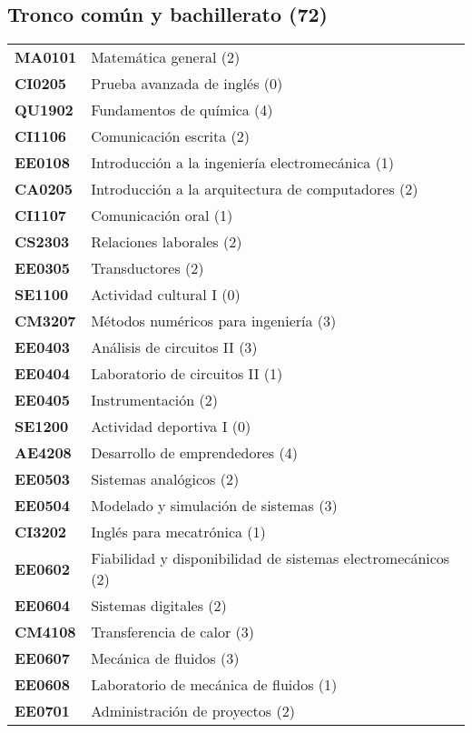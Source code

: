 \documentclass[letterpaper]{article}%
\begin{document}
\subsection*{Tronco común y bachillerato (72)}%
\label{subsec:Troncocomnybachillerato(72)}%
\vspace*{0.2cm}%
\begin{tabularx}{\textwidth}{p{1.5cm}p{10cm}}%
\textbf{MA0101}&Matemática general (2)\\%
\textbf{CI0205}&Prueba avanzada de inglés (0)\\%
\textbf{QU1902}&Fundamentos de química (4)\\%
\textbf{CI1106}&Comunicación escrita (2)\\%
\textbf{EE0108}&Introducción a la ingeniería electromecánica (1)\\%
\textbf{CA0205}&Introducción a la arquitectura de computadores (2)\\%
\textbf{CI1107}&Comunicación oral (1)\\%
\textbf{CS2303}&Relaciones laborales (2)\\%
\textbf{EE0305}&Transductores (2)\\%
\textbf{SE1100}&Actividad cultural I (0)\\%
\textbf{CM3207}&Métodos numéricos para ingeniería (3)\\%
\textbf{EE0403}&Análisis de circuitos II (3)\\%
\textbf{EE0404}&Laboratorio de circuitos II (1)\\%
\textbf{EE0405}&Instrumentación (2)\\%
\textbf{SE1200}&Actividad deportiva I (0)\\%
\textbf{AE4208}&Desarrollo de emprendedores (4)\\%
\textbf{EE0503}&Sistemas analógicos (2)\\%
\textbf{EE0504}&Modelado y simulación de sistemas (3)\\%
\textbf{CI3202}&Inglés para mecatrónica (1)\\%
\textbf{EE0602}&Fiabilidad y disponibilidad de sistemas electromecánicos (2)\\%
\textbf{EE0604}&Sistemas digitales (2)\\%
\textbf{CM4108}&Transferencia de calor (3)\\%
\textbf{EE0607}&Mecánica de fluidos (3)\\%
\textbf{EE0608}&Laboratorio de mecánica de fluidos (1)\\%
\textbf{EE0701}&Administración de proyectos (2)\\%

\end{tabularx}
\end{document}

